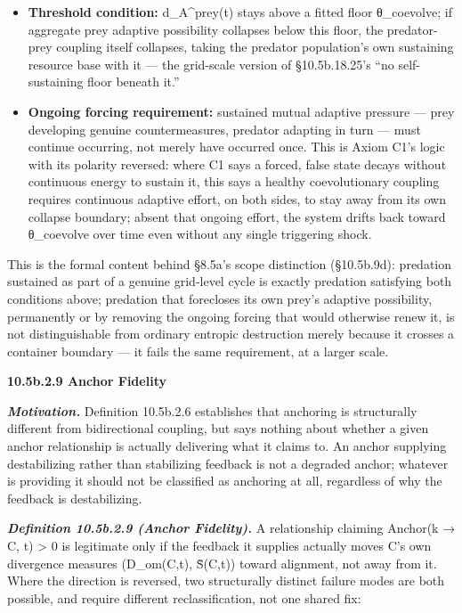 \documentclass[
]{article}
\begin{document}
\begin{itemize}
\item
  \textbf{Threshold condition:} d\_A\^{}prey(t) stays above a fitted
  floor θ\_coevolve; if aggregate prey adaptive possibility collapses
  below this floor, the predator-prey coupling itself collapses, taking
  the predator population's own sustaining resource base with it --- the
  grid-scale version of §10.5b.18.25's ``no self-sustaining floor
  beneath it.''
\item
  \textbf{Ongoing forcing requirement:} sustained mutual adaptive
  pressure --- prey developing genuine countermeasures, predator
  adapting in turn --- must continue occurring, not merely have occurred
  once. This is Axiom C1's logic with its polarity reversed: where C1
  says a forced, false state decays without continuous energy to sustain
  it, this says a healthy coevolutionary coupling requires continuous
  adaptive effort, on both sides, to stay away from its own collapse
  boundary; absent that ongoing effort, the system drifts back toward
  θ\_coevolve over time even without any single triggering shock.
\end{itemize}

This is the formal content behind §8.5a's scope distinction (§10.5b.9d):
predation sustained as part of a genuine grid-level cycle is exactly
predation satisfying both conditions above; predation that forecloses
its own prey's adaptive possibility, permanently or by removing the
ongoing forcing that would otherwise renew it, is not distinguishable
from ordinary entropic destruction merely because it crosses a container
boundary --- it fails the same requirement, at a larger scale.

\textbf{10.5b.2.9 Anchor Fidelity}

\emph{\textbf{Motivation.}} Definition 10.5b.2.6 establishes that
anchoring is structurally different from bidirectional coupling, but
says nothing about whether a given anchor relationship is actually
delivering what it claims to. An anchor supplying destabilizing rather
than stabilizing feedback is not a degraded anchor; whatever is
providing it should not be classified as anchoring at all, regardless of
why the feedback is destabilizing.

\emph{\textbf{Definition 10.5b.2.9 (Anchor Fidelity).}} A relationship
claiming Anchor(k → C, t) \textgreater{} 0 is legitimate only if the
feedback it supplies actually moves C's own divergence measures
(D\_om(C,t), S̃(C,t)) toward alignment, not away from it. Where the
direction is reversed, two structurally distinct failure modes are both
possible, and require different reclassification, not one shared fix:
\end{document}
